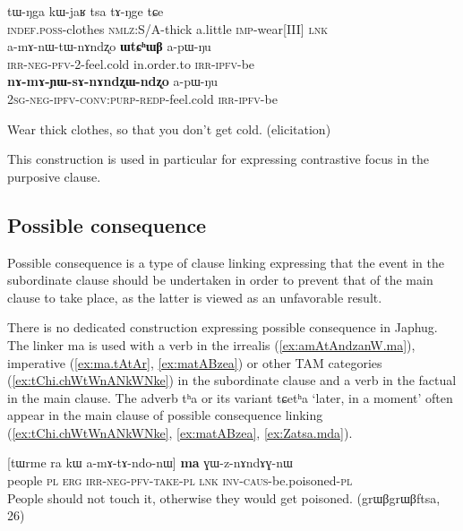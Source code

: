 \documentclass[oldfontcommands,oneside,a4paper,11pt]{article}
\newcommand{\ipa}[1]{{\phon \mbox{#1}}} %
\newcommand{\refb}[1]{(\ref{#1})}
\begin{document}
\begin{exe}
\ex \begin{xlist}
 \ex \label{ex:WtChWB.supporting2}  
\gll 
 \ipa{tɯ-ŋga}    	\ipa{kɯ-jaʁ}    	\ipa{tsa}    	\ipa{tɤ-ŋge} \ipa{tɕe}\\
 \textsc{indef.poss}-clothes \textsc{nmlz}:S/A-thick a.little \textsc{imp}-wear[III]  \textsc{lnk}\\ 
 \ex \label{ex:WtChWB.apWNu}  
\gll 
 	\ipa{a-mɤ-nɯ-tɯ-nɤndʐo}    	\ipa{\textbf{ɯtɕʰɯβ}}    	\ipa{a-pɯ-ŋu}    	\\
  \textsc{irr-neg-pfv}-2-feel.cold in.order.to \textsc{irr-ipfv}-be \\
\ex \label{ex:nAmAYWznAnAndzxWndzxo.apWNu}
\gll
\ipa{\textbf{nɤ-mɤ-ɲɯ-sɤ-nɤndʐɯ-ndʐo}}    	\ipa{a-pɯ-ŋu}\\
 \textsc{2sg-neg-ipfv-conv:purp-redp}-feel.cold \textsc{irr-ipfv}-be\\
  \end{xlist}
\glt Wear thick clothes, so that you don't get cold. (elicitation)
 \end{exe}

This construction is used in particular for expressing contrastive focus in the purposive clause.



\subsection{Possible consequence} \label{sec:possible.consequence}
Possible consequence is a type of clause linking expressing that the event in the subordinate clause should be undertaken in order to prevent that of the main clause to take place, as the latter is viewed as an unfavorable result. 
 
 There is no  dedicated construction expressing possible consequence in Japhug. The linker \ipa{ma} is used with a verb in the irrealis \refb{ex:amAtAndzanW.ma}, imperative (\ref{ex:ma.tAtAr}, \ref{ex:matABzea}) or other TAM categories \refb{ex:tChi.chWtWnANkWNke} in the subordinate clause and a verb in the factual in the main clause. The adverb \ipa{tʰa} or its variant \ipa{tɕetʰa} `later, in a moment' often appear in the main clause of possible consequence linking (\ref{ex:tChi.chWtWnANkWNke}, \ref{ex:matABzea}, \ref{ex:Zatsa.mda}).
 
 
 \begin{exe}
\ex \label{ex:amAtAndzanW.ma}
\gll 
[\ipa{tɯrme}    	\ipa{ra}    	\ipa{kɯ}    	\ipa{a-mɤ-tɤ-ndo-nɯ]}    	\ipa{\textbf{ma}}    	\ipa{ɣɯ-z-nɤndɤɣ-nɯ}        \\
people \textsc{pl} \textsc{erg} \textsc{irr-neg-pfv-take}-\textsc{pl} \textsc{lnk} \textsc{inv-caus}-be.poisoned-\textsc{pl} \\
\glt People should not touch it, otherwise they would get poisoned. (grɯβgrɯβftsa, 26)
 \end{exe}
 
\end{document}
